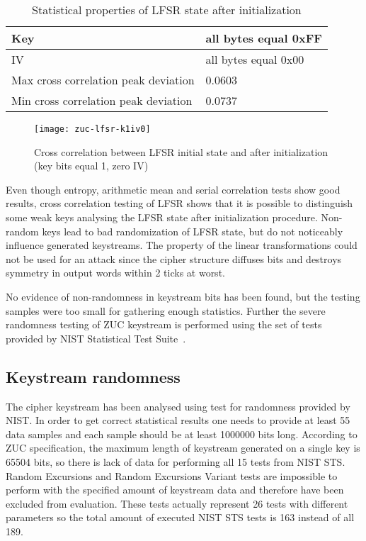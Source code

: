 \begin{table}[htbp]
    \centering
    \caption{Statistical properties of LFSR state after initialization}
    \label{tbl:lfsr-k1iv0}
    \begin{tabular}{|l|l|} \hline
        Key & all bytes equal 0xFF \\ \hline
        IV & all bytes equal 0x00 \\ \hline
        Max cross correlation peak deviation & 0.0603 \\ \hline
        Min cross correlation peak deviation & 0.0737 \\ \hline
    \end{tabular}
\end{table}

\begin{figure}[htbp]
	\centering
	\texttt{[image: zuc-lfsr-k1iv0]}
	\caption{Cross correlation between LFSR initial state and after
    initialization (key bits equal 1, zero IV)}
	\label{fig:lfsr-k1iv0}
\end{figure}

Even though entropy, arithmetic mean and serial correlation tests show good
results, cross correlation testing of LFSR shows that it is possible to
distinguish some weak keys analysing the LFSR state after initialization
procedure. Non-random keys lead to bad randomization of LFSR state, but do not
noticeably influence generated keystreams. The property of the linear
transformations could not be used for an attack since the cipher structure
diffuses bits and destroys symmetry in output words within 2 ticks at worst.

No evidence of non-randomness in keystream bits has been found, but the testing
samples were too small for gathering enough statistics. Further the severe
randomness testing of ZUC keystream is performed using the set of tests
provided by NIST Statistical Test Suite~\cite{nist-sts}.

\subsection{Keystream randomness}

The cipher keystream has been analysed using test for randomness provided by
NIST. In order to get correct statistical results one needs to provide at least
55 data samples and each sample should be at least 1000000 bits long. According
to ZUC specification, the maximum length of keystream generated on a single key
is 65504 bits, so there is lack of data for performing all 15 tests from NIST
STS. Random Excursions and Random Excursions Variant tests are impossible to
perform with the specified amount of keystream data and therefore have been
excluded from evaluation. These tests actually represent 26 tests with
different parameters so the total amount of executed NIST STS tests is 163
instead of all 189.


